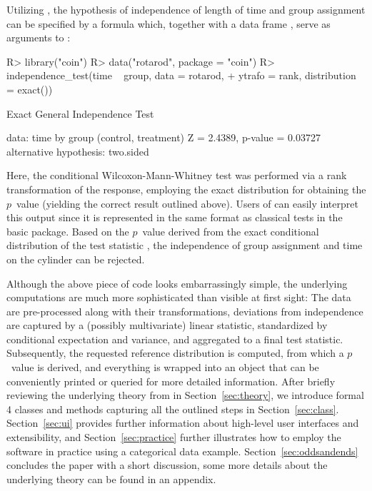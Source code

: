 \documentclass[article]{jss}
\begin{document}
Utilizing , the hypothesis of independence of length of time and group assignment can
be specified by a formula which, together with a data frame , 
serve as arguments to : 
\begin{Schunk}
\begin{Sinput}
R> library("coin")
R> data("rotarod", package = "coin")
R> independence_test(time ~ group, data = rotarod,
+    ytrafo = rank, distribution = exact())
\end{Sinput}
\begin{Soutput}
	Exact General Independence Test

data:  time by group (control, treatment) 
Z = 2.4389, p-value = 0.03727
alternative hypothesis: two.sided 
\end{Soutput}
\end{Schunk}
Here, the conditional Wilcoxon-Mann-Whitney test was performed
via a rank transformation of the response, employing the exact distribution for
obtaining the $p$~value (yielding the correct result outlined above).
Users of  can easily interpret this output since
it is represented in the same format as classical tests in the basic
 package. Based on the $p$~value derived from
the exact conditional distribution of the test statistic ,
the independence of group assignment and time on the cylinder can be rejected.

Although the above piece of code looks embarrassingly simple, the
underlying computations are much more sophisticated than visible at
first sight: The data are pre-processed along with their
transformations, deviations from independence are captured by a
(possibly multivariate) linear statistic, standardized by conditional
expectation and variance, and aggregated to a final test
statistic. Subsequently, the requested reference distribution is
computed, from which a $p$~value is derived, and everything is wrapped
into an object that can be conveniently printed or queried for more
detailed information. After briefly reviewing the underlying theory from
\cite{StrasserWeber1999} in Section~\ref{sec:theory}, we introduce
formal 4 classes and methods capturing all the outlined
steps in Section~\ref{sec:class}. Section~\ref{sec:ui} provides further
information about high-level user interfaces and extensibility, and
Section~\ref{sec:practice} further illustrates how to employ the
software in practice using a categorical data example.
Section~\ref{sec:oddsandends} concludes the paper with a short
discussion, some more details about the underlying theory can be found
in an appendix.
\end{document}
